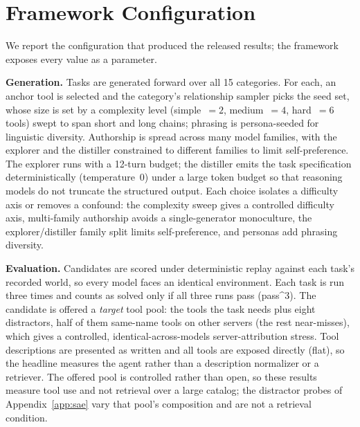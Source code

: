 \section{Framework Configuration}
\label{app:config}
We report the configuration that produced the released results; the framework
exposes every value as a parameter.

\noindent\textbf{Generation.} Tasks are generated forward over all 15
categories. For each, an anchor tool is selected and the category's
relationship sampler picks the seed set, whose size is set by a complexity
level (simple~$=2$, medium~$=4$, hard~$=6$ tools) swept to span short and long
chains; phrasing is persona-seeded for linguistic diversity. Authorship is
spread across many model families, with the explorer and the distiller
constrained to different families to limit self-preference. The
explorer runs with a 12-turn budget; the distiller emits the task
specification deterministically (temperature~0) under a large token budget so
that reasoning models do not truncate the structured output. Each choice
isolates a difficulty axis or removes a confound: the complexity sweep gives a
controlled difficulty axis, multi-family authorship avoids a single-generator
monoculture, the explorer/distiller family split limits self-preference, and
personas add phrasing diversity.

\noindent\textbf{Evaluation.} Candidates are scored under deterministic replay
against each task's recorded world, so every model faces an identical
environment. Each task is run three times and counts as solved only if all
three runs pass (pass\textasciicircum{}3). The candidate is offered a
\emph{target} tool pool: the tools the task needs plus eight distractors, half
of them same-name tools on other servers (the rest near-misses), which gives a
controlled, identical-across-models server-attribution stress. Tool
descriptions are presented as written and all tools are exposed directly
(flat), so the headline measures the agent rather than a description
normalizer or a retriever. The offered pool is controlled rather than open, so
these results measure tool use and not retrieval over a large catalog; the
distractor probes of Appendix~\ref{app:sae} vary that pool's composition and
are not a retrieval condition.

